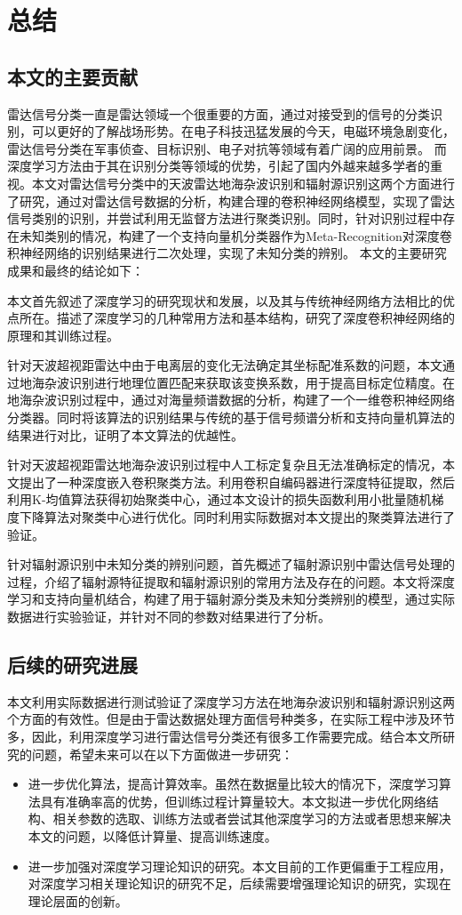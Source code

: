 \chapter{总结}
\label{sec:paper_summary}
\section{本文的主要贡献}
雷达信号分类一直是雷达领域一个很重要的方面，通过对接受到的信号的分类识别，可以更好的了解战场形势。在电子科技迅猛发展的今天，电磁环境急剧变化，雷达信号分类在军事侦查、目标识别、电子对抗等领域有着广阔的应用前景。
而深度学习方法由于其在识别分类等领域的优势，引起了国内外越来越多学者的重视。本文对雷达信号分类中的天波雷达地海杂波识别和辐射源识别这两个方面进行了研究，通过对雷达信号数据的分析，构建合理的卷积神经网络模型，实现了雷达信号类别的识别，并尝试利用无监督方法进行聚类识别。同时，针对识别过程中存在未知类别的情况，构建了一个支持向量机分类器作为Meta-Recognition对深度卷积神经网络的识别结果进行二次处理，实现了未知分类的辨别。
本文的主要研究成果和最终的结论如下：

本文首先叙述了深度学习的研究现状和发展，以及其与传统神经网络方法相比的优点所在。描述了深度学习的几种常用方法和基本结构，研究了深度卷积神经网络的原理和其训练过程。

针对天波超视距雷达中由于电离层的变化无法确定其坐标配准系数的问题，本文通过地海杂波识别进行地理位置匹配来获取该变换系数，用于提高目标定位精度。在地海杂波识别过程中，通过对海量频谱数据的分析，构建了一个一维卷积神经网络分类器。同时将该算法的识别结果与传统的基于信号频谱分析和支持向量机算法的结果进行对比，证明了本文算法的优越性。

针对天波超视距雷达地海杂波识别过程中人工标定复杂且无法准确标定的情况，本文提出了一种深度嵌入卷积聚类方法。利用卷积自编码器进行深度特征提取，然后利用K-均值算法获得初始聚类中心，通过本文设计的损失函数利用小批量随机梯度下降算法对聚类中心进行优化。同时利用实际数据对本文提出的聚类算法进行了验证。

针对辐射源识别中未知分类的辨别问题，首先概述了辐射源识别中雷达信号处理的过程，介绍了辐射源特征提取和辐射源识别的常用方法及存在的问题。本文将深度学习和支持向量机结合，构建了用于辐射源分类及未知分类辨别的模型，通过实际数据进行实验验证，并针对不同的参数对结果进行了分析。
\section{后续的研究进展}
本文利用实际数据进行测试验证了深度学习方法在地海杂波识别和辐射源识别这两个方面的有效性。但是由于雷达数据处理方面信号种类多，在实际工程中涉及环节多，因此，利用深度学习进行雷达信号分类还有很多工作需要完成。结合本文所研究的问题，希望未来可以在以下方面做进一步研究：
\begin{itemize}
	\item 进一步优化算法，提高计算效率。虽然在数据量比较大的情况下，深度学习算法具有准确率高的优势，但训练过程计算量较大。本文拟进一步优化网络结构、相关参数的选取、训练方法或者尝试其他深度学习的方法或者思想来解决本文的问题，以降低计算量、提高训练速度。
	\item 进一步加强对深度学习理论知识的研究。本文目前的工作更偏重于工程应用，对深度学习相关理论知识的研究不足，后续需要增强理论知识的研究，实现在理论层面的创新。
\end{itemize}
